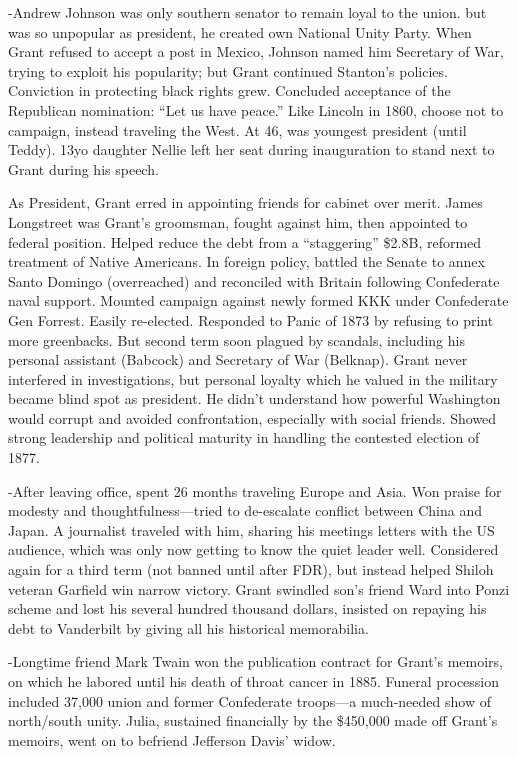 \documentclass[
]{article}
\begin{document}
-Andrew Johnson was only southern senator to remain loyal to the union.
but was so unpopular as president, he created own National Unity Party.
When Grant refused to accept a post in Mexico, Johnson named him
Secretary of War, trying to exploit his popularity; but Grant continued
Stanton's policies. Conviction in protecting black rights grew.
Concluded acceptance of the Republican nomination: ``Let us have
peace.'' Like Lincoln in 1860, choose not to campaign, instead traveling
the West. At 46, was youngest president (until Teddy). 13yo daughter
Nellie left her seat during inauguration to stand next to Grant during
his speech.

As President, Grant erred in appointing friends for cabinet over merit.
James Longstreet was Grant's groomsman, fought against him, then
appointed to federal position. Helped reduce the debt from a
``staggering'' \$2.8B, reformed treatment of Native Americans. In
foreign policy, battled the Senate to annex Santo Domingo (overreached)
and reconciled with Britain following Confederate naval support. Mounted
campaign against newly formed KKK under Confederate Gen Forrest. Easily
re-elected. Responded to Panic of 1873 by refusing to print more
greenbacks. But second term soon plagued by scandals, including his
personal assistant (Babcock) and Secretary of War (Belknap). Grant never
interfered in investigations, but personal loyalty which he valued in
the military became blind spot as president. He didn't understand how
powerful Washington would corrupt and avoided confrontation, especially
with social friends. Showed strong leadership and political maturity in
handling the contested election of 1877.

-After leaving office, spent 26 months traveling Europe and Asia. Won
praise for modesty and thoughtfulness---tried to de-escalate conflict
between China and Japan. A journalist traveled with him, sharing his
meetings letters with the US audience, which was only now getting to
know the quiet leader well. Considered again for a third term (not
banned until after FDR), but instead helped Shiloh veteran Garfield win
narrow victory. Grant swindled son's friend Ward into Ponzi scheme and
lost his several hundred thousand dollars, insisted on repaying his debt
to Vanderbilt by giving all his historical memorabilia.

-Longtime friend Mark Twain won the publication contract for Grant's
memoirs, on which he labored until his death of throat cancer in 1885.
Funeral procession included 37,000 union and former Confederate
troops---a much-needed show of north/south unity. Julia, sustained
financially by the \$450,000 made off Grant's memoirs, went on to
befriend Jefferson Davis' widow.
\end{document}
